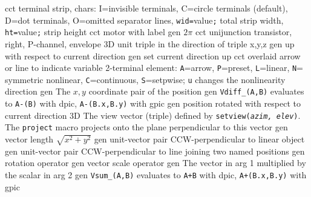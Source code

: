   {cct}
  {terminal strip, chars:
   I=invisible terminals,
   C=circle terminals (default),
   D=dot terminals,
   O=omitted separator lines,
   {\tt wid=}value{\tt ;} total strip width,
   {\tt ht=}value{\tt ;} strip height
    }
  {cct}
  {motor with label}
  {gen}
  {$2\pi$}
%
  {cct}
  {unijunction transistor, right, P-channel, envelope
    }
  {3D}
  {unit triple in the direction of triple x,y,z}
  {gen}
  {up with respect to current direction}
  {gen}
  {set current direction up }
%
  {cct}
  {overlaid arrow or line to indicate variable 2-terminal element:
    {\tt A}=arrow, {\tt P}=preset,
    {\tt L}=linear,
    {\tt N}= symmetric nonlinear,
    {\tt C}=continuous, {\tt S}=setpwise; {\tt u} changes the
    nonlinearity direction
   }
  {gen}
  {The $x, y$ coordinate pair of the position}
  {gen}
  {{\tt Vdiff\_(A,B)} evaluates to {\tt A-(B)} with dpic, {\tt A-(B.x,B.y)}
   with gpic}
  {gen}
  {position rotated with respect to current direction}
  {3D}
  {The view vector (triple) defined by {\tt setview({\sl azim, elev})}. The
   {\tt project}
   macro projects onto the plane perpendicular to this vector}
  {gen}
  {vector length $\sqrt{x^2+y^2}$}
  {gen}
  {unit-vector pair CCW-perpendicular to linear object}
  {gen}
  {unit-vector pair CCW-perpendicular to line joining two named positions}
  {gen}
  {rotation operator}
  {gen}
  {vector scale operator}
  {gen}
  {The vector in arg 1 multiplied by the scalar in arg 2}
  {gen}
  {{\tt Vsum\_(A,B)} evaluates to {\tt A+B} with dpic, {\tt A+(B.x,B.y)}
   with gpic}
